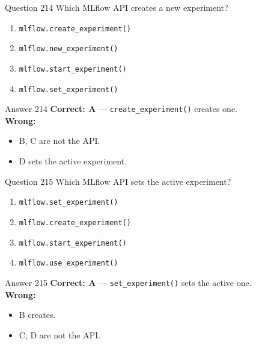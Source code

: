 \documentclass[aspectratio=169,11pt]{beamer}
\begin{document}
	\begin{frame}{Question 214}
		Which MLflow API creates a new experiment?
		\begin{enumerate}[label=\Alph*.]
			\item \texttt{mlflow.create\_experiment()}
			\item \texttt{mlflow.new\_experiment()}
			\item \texttt{mlflow.start\_experiment()}
			\item \texttt{mlflow.set\_experiment()}
		\end{enumerate}
	\end{frame}
	\begin{frame}{Answer 214}
		\textbf{Correct: A} --- \texttt{create\_experiment()} creates one.\\
		\vspace{0.5em}
		\textbf{Wrong:}
		\begin{itemize}
			\item B, C are not the API.
			\item D sets the active experiment.
		\end{itemize}
	\end{frame}
	
	\begin{frame}{Question 215}
		Which MLflow API sets the active experiment?
		\begin{enumerate}[label=\Alph*.]
			\item \texttt{mlflow.set\_experiment()}
			\item \texttt{mlflow.create\_experiment()}
			\item \texttt{mlflow.start\_experiment()}
			\item \texttt{mlflow.use\_experiment()}
		\end{enumerate}
	\end{frame}
	\begin{frame}{Answer 215}
		\textbf{Correct: A} --- \texttt{set\_experiment()} sets the active one.\\
		\vspace{0.5em}
		\textbf{Wrong:}
		\begin{itemize}
			\item B creates.
			\item C, D are not the API.
		\end{itemize}
	\end{frame}
	
\end{document}
